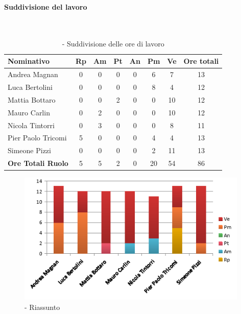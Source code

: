 \documentclass[./PianoDiProgetto.tex]{subfiles}
\begin{document}
\vspace{35mm}


	\subsubsection{\PerV}
				\paragraph{Suddivisione del lavoro}\

	\begin{table}[H]
		\begin{tabularx}{\textwidth}{l  * {6}{c}  c}
			\toprule
			\textbf{Nominativo} & \textbf{Rp} & \textbf{Am} & \textbf{Pt}
						& \textbf{An} & \textbf{Pm} & \textbf{Ve} & \textbf{Ore totali} \\
			\midrule
			Andrea Magnan  & 0 & 0 & 0 & 0 & 6 & 7 & 13 \\
			Luca Bertolini  & 0 & 0 & 0 & 0 & 8 & 4 & 12 \\
			Mattia Bottaro  & 0 & 0 & 2 & 0 & 0 & 10 & 12 \\
			Mauro Carlin  & 0 & 2 & 0 & 0 & 0 & 10 & 12 \\
			Nicola Tintorri  & 0 & 3 & 0 & 0 & 0 & 8 & 11 \\
			Pier Paolo Tricomi  & 5 & 0 & 0 & 0 & 4 & 4 & 13 \\
			Simeone Pizzi & 0 & 0 & 0 & 0 & 2 & 11 & 13 \\
			\midrule
			\textbf{Ore Totali Ruolo} & 5 & 5 & 2 & 0 & 20 & 54 & 86 \\
			\bottomrule
		\end{tabularx}
		\caption{\PerV{} - Suddivisione delle ore di lavoro}
	\end{table}
\vfill


	\begin{figure}[H]
		\centering
		\includegraphics[width=11cm, trim=1cm 0cm 1cm 0cm]{grafici/V-persona}
			\caption{\PerV{} - Riassunto}
	\end{figure}
\end{document}

